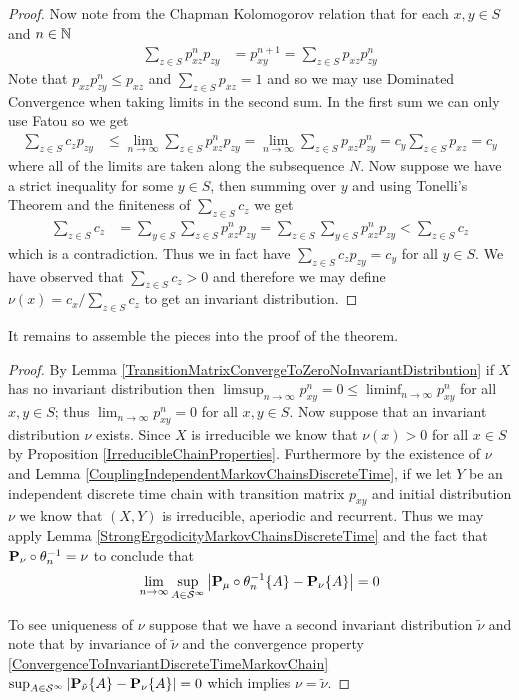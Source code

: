 \begin{proof}
Now note from the Chapman Kolomogorov relation that for each $x,y \in
S$ and $n \in \naturals$
\begin{align*}
\sum_{z \in S} p^n_{xz}p_{zy} &= p^{n+1}_{xy} = \sum_{z \in S} p_{xz}p^n_{zy}
\end{align*}
Note that $p_{xz}p^n_{zy} \leq p_{xz}$ and $\sum_{z \in S} p_{xz} = 1$
and so we may use Dominated Convergence when taking limits in the
second sum.  In the first sum we can only use Fatou so we get
\begin{align*}
\sum_{z \in S} c_z p_{zy} &\leq \lim_{n \to \infty} \sum_{z \in S}
                           p^n_{xz}p_{zy} 
= \lim_{n \to \infty} \sum_{z \in S}p_{xz}p^n_{zy} 
= c_y \sum_{z \in S}p_{xz}  = c_y
\end{align*}
where all of the limits are taken along the subsequence $N$.
Now suppose we have a strict inequality for some $y \in S$, then
summing over $y$ and using Tonelli's Theorem 
and the finiteness of $\sum_{z \in S} c_z$ we get
\begin{align*}
\sum_{z \in S} c_z &= \sum_{y \in S}\sum_{z \in S} p^n_{xz}p_{zy} =
                     \sum_{z \in S} \sum_{y \in S} p^n_{xz}p_{zy} < \sum_{z \in S} c_z
\end{align*}
which is a contradiction.  Thus we in fact have $\sum_{z \in S} c_z
p_{zy} = c_y$ for all $y \in S$.  We have observed that $\sum_{z \in S}
c_z > 0$ and therefore we may define $\nu(x) = c_x / \sum_{z \in S}
c_z$ to get an invariant distribution.
\end{proof}

It remains to assemble the pieces into the proof of the theorem.
\begin{proof}
By Lemma \ref{TransitionMatrixConvergeToZeroNoInvariantDistribution}
if $X$ has no invariant distribution then $\limsup_{n \to \infty}
p^n_{xy} = 0 \leq \liminf_{n \to \infty} p^n_{xy}$ for all $x,y \in
S$; thus $\lim_{n \to \infty} p^n_{xy} = 0$ for all $x,y \in S$.  Now
suppose that an invariant distribution $\nu$ exists.  Since $X$ is
irreducible we know that
$\nu(x) > 0$ for all $x \in S$ by Proposition
\ref{IrreducibleChainProperties}.  Furthermore by the existence of
$\nu$ and Lemma \ref{CouplingIndependentMarkovChainsDiscreteTime}, if
we let $Y$ be an independent discrete time chain with transition
matrix $p_{xy}$ and initial distribution $\nu$ we
know that $(X,Y)$ is irreducible, aperiodic and recurrent.  Thus we
may apply Lemma \ref{StrongErgodicityMarkovChainsDiscreteTime} and the
fact that $\pushforward{\theta_n}{\probabilityop_\nu} = \nu$ to
conclude that 
\begin{align*}
\lim_{n \to \infty} \sup_{A \in \mathcal{S}^\infty} \abs{\pushforward{\theta_n}{\probabilityop_\mu}\lbrace A \rbrace -
  \sprobability{A}{\nu}} = 0
\end{align*}

To see uniqueness of $\nu$ suppose that we have a second invariant
distribution $\tilde{\nu}$ and note that by invariance of
$\tilde{\nu}$ and the convergence property \eqref{ConvergenceToInvariantDiscreteTimeMarkovChain}
$\sup_{A \in \mathcal{S}^\infty} \abs{\sprobability{A}{\tilde{\nu}}-
  \sprobability{A}{\nu}} = 0$ which implies $\nu =\tilde{\nu}$.
\end{proof}

